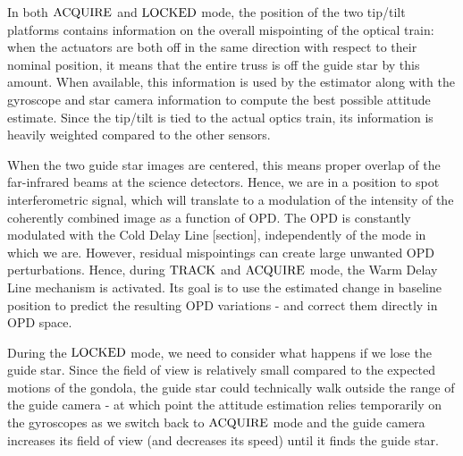 In both $\textrm{ACQUIRE}$ and $\textrm{LOCKED}$ mode, the position of the two tip/tilt platforms contains information on the overall mispointing of the optical train: when the actuators are both off in the same direction with respect to their nominal position, it means that the entire truss is off the guide star by this amount. When available, this information is used by the estimator along with the gyroscope and star camera information to compute the best possible attitude estimate. Since the tip/tilt is tied to the actual optics train, its information is heavily weighted compared to the other sensors. 

When the two guide star images are centered, this means proper overlap of the far-infrared beams at the science detectors. Hence, we are in a position to spot interferometric signal, which will translate to a modulation of the intensity of the coherently combined image as a function of OPD. The OPD is constantly modulated with the Cold Delay Line [section], independently of the mode in which we are. However, residual mispointings can create large unwanted OPD perturbations. Hence, during $\textrm{TRACK}$ and $\textrm{ACQUIRE}$ mode, the Warm Delay Line mechanism is activated. Its goal is to use the estimated change in baseline position to predict the resulting OPD variations - and correct them directly in OPD space. 

During the $\textrm{LOCKED}$ mode, we need to consider what happens if we lose the guide star. Since the field of view is relatively small compared to the expected motions of the gondola, the guide star could technically walk outside the range of the guide camera - at which point the attitude estimation relies temporarily on the gyroscopes as we switch back to $\textrm{ACQUIRE}$ mode and the guide camera increases its field of view (and decreases its speed) until it finds the guide star.

